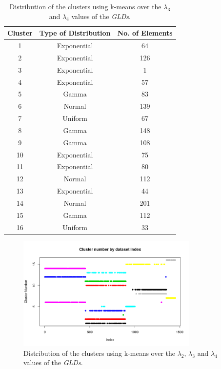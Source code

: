 \begin{table}[]
\centering
\caption{Distribution of the clusters using k-means over the $\lambda_{3}$ and $\lambda_{4}$ values of the \textit{GLDs}.}
\label{tab:dataset2_l3l4}
\begin{tabular}{|c|c|c|}
\hline
Cluster & Type of Distribution & No. of Elements \\ \hline
1       & Exponential          & 64              \\ \hline
2       & Exponential          & 126              \\ \hline
3       & Exponential          & 1             \\ \hline
4       & Exponential               & 57              \\ \hline
5       & Gamma               & 83             \\ \hline
6       & Normal               & 139            \\ \hline
7       & Uniform              & 67            \\ \hline
8       & Gamma          & 148              \\ \hline
9       & Gamma          & 108               \\ \hline
10      & Exponential               & 75              \\ \hline
11      & Exponential          & 80              \\ \hline
12       & Normal              & 112             \\ \hline
13       & Exponential          & 44              \\ \hline
14       & Normal          & 201              \\ \hline
15      & Gamma               & 112              \\ \hline
16      & Uniform          & 33              \\ \hline
\end{tabular}
\end{table}
 
 \begin{figure}[H]
    \centering
    \includegraphics[width=0.8\textwidth]{img/gld_clustering/Dataset2/nuevo/l3_l4/clusters_by_index.png}
    \caption{Distribution of the clusters using k-means over the $\lambda_{2}$, $\lambda_{3}$ and $\lambda_{4}$ values of the \textit{GLDs}.}
    \label{fig:dataset2_l3l4}
\end{figure}

